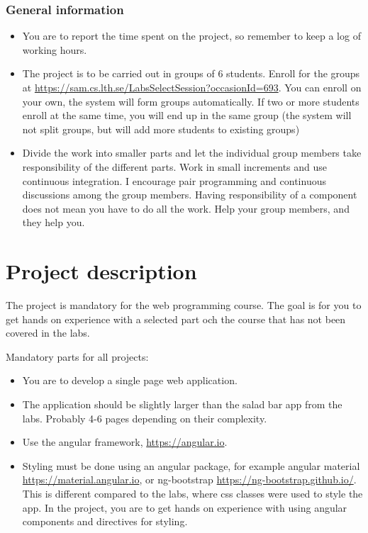 \documentclass[fleqn, article, a4paper]{memoir}
\begin{document}
\maketitle
\thispagestyle{titlepage}
\vspace{-4cm}

\subsubsection*{General information}

\begin{itemize}\firmlist
\item You are to report the time spent on the project, so remember to keep a log of working hours.
\item The project is to be carried out in groups of 6 students. Enroll for the groups at \url{https://sam.cs.lth.se/LabsSelectSession?occasionId=693}. You can enroll on your own, the system will form groups automatically. If two or more students  enroll at the same time, you will end up in the same group (the system will not split groups, but will add more students to existing groups)
\item Divide the work into smaller parts and let the individual group members take responsibility of the different parts. Work in small increments and use continuous integration. I encourage pair programming and continuous discussions among the group members. Having responsibility of a component does not mean you have to do all the work. Help your group members, and they help you.
\end{itemize}

\section*{Project description}
\n The project is mandatory for the web programming course. The goal is for you to get hands on experience with a selected part och the course that has not been covered in the labs.

\noindent Mandatory parts for all projects:
\begin{itemize}\firmlist
\item You are to develop a single page web application.
\item The application should be slightly larger than the salad bar app from the labs. Probably 4-6 pages depending on their complexity.
\item Use the angular framework, \url{https://angular.io}.
\item Styling must be done using an angular package, for example angular material \url{https://material.angular.io}, or ng-bootstrap \url{https://ng-bootstrap.github.io/}. This is different compared to the labs, where css classes were used to style the app. In the project, you are to get hands on experience with using angular components and directives for styling.
\end{itemize}
\end{document}
